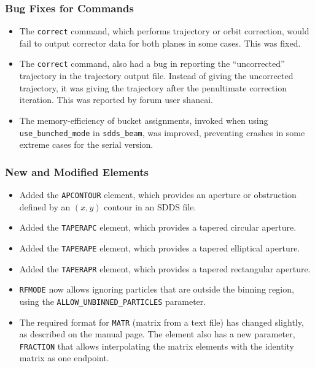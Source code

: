 \documentclass[11pt]{article}
\begin{document}
\subsubsection{Bug Fixes for Commands}
\begin{itemize}
\item The \verb|correct| command, which performs trajectory or orbit correction, would fail to output corrector
  data for both planes in some cases. This was fixed.
\item The \verb|correct| command, also had a bug in reporting the ``uncorrected'' trajectory in the trajectory output file.
  Instead of giving the uncorrected trajectory, it was giving the trajectory after the penultimate correction iteration.
  This was reported by forum user shancai.
\item The memory-efficiency of bucket assignments, invoked when using \verb|use_bunched_mode| in \verb|sdds_beam|,
  was improved, preventing crashes in some extreme cases for the serial version.
\end{itemize}

\subsubsection{New and Modified Elements}
\begin{itemize}
\item Added the \verb|APCONTOUR| element, which provides an aperture or obstruction defined by an $(x, y)$ contour in an SDDS file.
\item Added the \verb|TAPERAPC| element, which provides a tapered circular aperture.
\item Added the \verb|TAPERAPE| element, which provides a tapered elliptical aperture.
\item Added the \verb|TAPERAPR| element, which provides a tapered rectangular aperture.
\item \verb|RFMODE| now allows ignoring particles that are outside the binning region, using the \verb|ALLOW_UNBINNED_PARTICLES|
  parameter.
\item The required format for \verb|MATR| (matrix from a text file) has changed slightly, as described on the manual page.
  The element also has a new parameter, \verb|FRACTION| that allows interpolating the matrix elements with the identity
  matrix as one endpoint.
\end{itemize}
\end{document}
